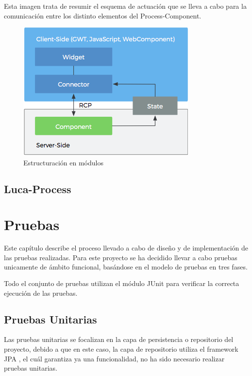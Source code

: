 \documentclass[a4paper,12pt]{book}
\begin{document}
		Esta imagen trata de  resumir el esquema de actuación que se lleva a cabo para la comunicación entre los distinto elementos del Process-Component.
		
		\begin{figure}[H]
			\centering
			\includegraphics[scale=1.25]{schema.png}
			\caption{Estructuración en módulos}\label{fig:schema}
		\end{figure}
		
		
		\section{Luca-Process}
	
	\clearpage
	
	
	\chapter{Pruebas}
	
	Este capítulo describe el proceso llevado a cabo de diseño y de implementación de las pruebas realizadas. Para este proyecto se ha decidido llevar a cabo pruebas unicamente de ámbito funcional, basándose en el modelo de pruebas en tres fases.
	
	\vspace{5mm}
	
	Todo el conjunto de pruebas utilizan el módulo JUnit \cite{jpaunit} para verificar la correcta ejecución de las pruebas.
	
	\minitoc
	
		\section{Pruebas Unitarias}
		
		Las pruebas unitarias se focalizan en la capa de persistencia o repositorio del proyecto, debido a que en este caso, la capa de repositorio utiliza el framework JPA \cite{jpa}, el cuál garantiza ya una funcionalidad, no ha sido necesario realizar pruebas unitarias.
		
\end{document}
